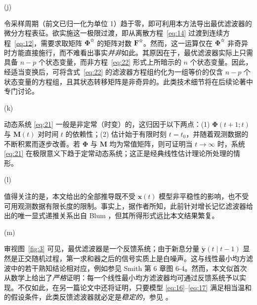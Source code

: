 
\begin{remarkn}{(j)}\label{rem:j}

令采样周期（前文已归一化为单位 1）趋于零，即可利用本方法导出最优滤波器的微分方程表征。欲实施这一极限过渡，即从离散方程~\eqref{eq:14} 过渡到连续方程~\eqref{eq:12}，需要求取矩阵 $\bm{\Phi}^{\text{✫}}$ 的矩阵对数 $\bm{F}^{\text{✫}}$。然而，这一运算仅在 $\bm{\Phi}^{\text{✫}}$ 非奇异时方能直接施行，而不难看出事实\emph{并非}如此。其原因在于，最优滤波器实际上只需具备 $n - p$ 个状态变量，而非方程~\eqref{eq:22} 形式上所暗示的 $n$ 个状态变量。因此，经适当变换后，可将含式~\eqref{eq:22} 的滤波器方程组约化为一组等价的仅含 $n - p$ 个状态变量的方程组，且其状态转移矩阵是非奇异的。此类技术细节将在后续论著中专门讨论。

\end{remarkn}

\begin{remarkn}{(k)}\label{rem:k}

动态系统 \eqref{eq:21} 一般是非定常（时变）的，这归因于以下两点：(1) $\bm{\Phi}(t + 1; t)$ 与 $\bm{M}(t)$ 对时间 $t$ 的依赖性；(2) 估计始于有限时刻 $t = t_0$，并随着观测数据的不断积累而逐步改善。若 $\bm{\Phi}$ 与 $\bm{M}$ 均为常值矩阵，则可证明当 $t \to \infty$ 时，系统 \eqref{eq:21} 在极限意义下趋于定常动态系统；这正是经典线性估计理论所处理的情形。

\end{remarkn}

\begin{remarkn}{(l)}\label{rem:l}

值得关注的是，本文给出的全部推导既不受 $\bm{x}(t)$ 模型非平稳性的影响，也不受可用观测数据有限长度的限制。事实上，据作者所知，此前针对增长记忆滤波器给出的唯一显式递推关系出自 Blum \cite{r12}，但其所得形式远比本文结果繁复。

\end{remarkn}

\begin{remarkn}{(m)}\label{rem:m}

审视图~\ref{fig:3} 可见，最优滤波器是一个反馈系统；由于新息分量 $\tilde{\bm{y}}(t \mid t - 1)$ 显然是正交随机过程，第一求和器之后的信号实质上是白噪声。这与线性最小均方滤波中的若干熟知结论相对应，例如参见 Smith \cite{r28} 第 6 章图 6-4。然而，本文似首次从数学上给出了\emph{严格}证明：每一个线性最小均方滤波器均可通过反馈系统予以实现。不仅如此，在另一篇论文中还将证明，只要模型 \eqref{eq:16}–\eqref{eq:17} 满足相当温和的假设条件，此类反馈滤波器就必定是\emph{稳定的}，参见 \cite{r29}。

\end{remarkn}

